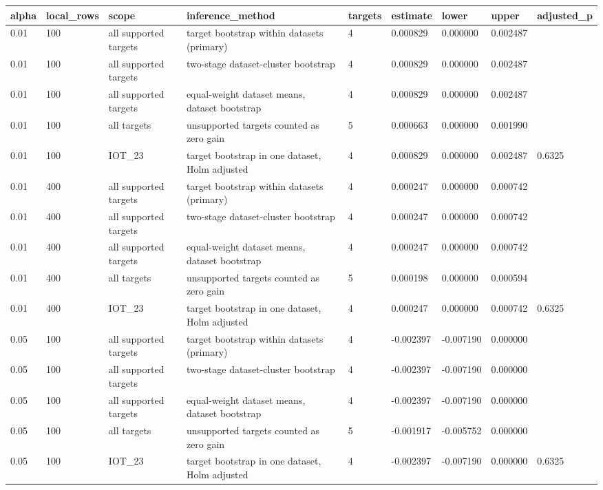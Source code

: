 \begin{tabular}{lllllllll}
\toprule
alpha & local\_rows & scope & inference\_method & targets & estimate & lower & upper & adjusted\_p \\
\midrule
0.01 & 100 & all supported targets & target bootstrap within datasets (primary) & 4 & 0.000829 & 0.000000 & 0.002487 &  \\
0.01 & 100 & all supported targets & two-stage dataset-cluster bootstrap & 4 & 0.000829 & 0.000000 & 0.002487 &  \\
0.01 & 100 & all supported targets & equal-weight dataset means, dataset bootstrap & 4 & 0.000829 & 0.000000 & 0.002487 &  \\
0.01 & 100 & all targets & unsupported targets counted as zero gain & 5 & 0.000663 & 0.000000 & 0.001990 &  \\
0.01 & 100 & IOT\_23 & target bootstrap in one dataset, Holm adjusted & 4 & 0.000829 & 0.000000 & 0.002487 & 0.6325 \\
0.01 & 400 & all supported targets & target bootstrap within datasets (primary) & 4 & 0.000247 & 0.000000 & 0.000742 &  \\
0.01 & 400 & all supported targets & two-stage dataset-cluster bootstrap & 4 & 0.000247 & 0.000000 & 0.000742 &  \\
0.01 & 400 & all supported targets & equal-weight dataset means, dataset bootstrap & 4 & 0.000247 & 0.000000 & 0.000742 &  \\
0.01 & 400 & all targets & unsupported targets counted as zero gain & 5 & 0.000198 & 0.000000 & 0.000594 &  \\
0.01 & 400 & IOT\_23 & target bootstrap in one dataset, Holm adjusted & 4 & 0.000247 & 0.000000 & 0.000742 & 0.6325 \\
0.05 & 100 & all supported targets & target bootstrap within datasets (primary) & 4 & -0.002397 & -0.007190 & 0.000000 &  \\
0.05 & 100 & all supported targets & two-stage dataset-cluster bootstrap & 4 & -0.002397 & -0.007190 & 0.000000 &  \\
0.05 & 100 & all supported targets & equal-weight dataset means, dataset bootstrap & 4 & -0.002397 & -0.007190 & 0.000000 &  \\
0.05 & 100 & all targets & unsupported targets counted as zero gain & 5 & -0.001917 & -0.005752 & 0.000000 &  \\
0.05 & 100 & IOT\_23 & target bootstrap in one dataset, Holm adjusted & 4 & -0.002397 & -0.007190 & 0.000000 & 0.6325 \\

\end{tabular}
